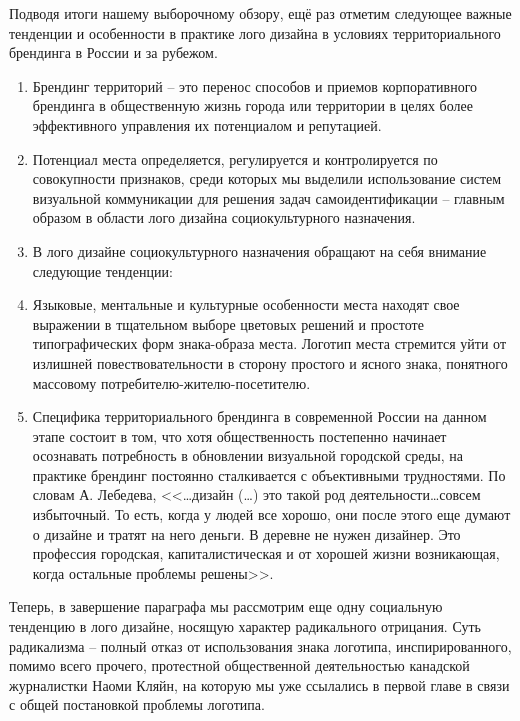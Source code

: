 Подводя итоги нашему выборочному обзору, ещё раз отметим следующее важные тенденции и особенности в
практике лого дизайна в условиях территориального брендинга в России и за рубежом.
\begin{enumerate}
\item Брендинг территорий -- это перенос способов и приемов корпоративного брендинга в общественную
  жизнь города или территории  в целях более эффективного управления их потенциалом и репутацией.
\item Потенциал места определяется, регулируется и контролируется по совокупности признаков, среди
  которых мы выделили использование систем визуальной коммуникации для решения задач
  самоидентификации -- главным образом в области лого дизайна социокультурного назначения.
\item В лого дизайне социокультурного назначения обращают на себя внимание следующие тенденции:
\item Языковые, ментальные и культурные особенности места находят свое выражении в тщательном выборе
  цветовых решений и простоте типографических форм знака-образа места. Логотип места стремится уйти
  от излишней повествовательности в сторону простого и ясного знака, понятного массовому
  потребителю-жителю-посетителю.
\item Специфика территориального брендинга в современной России на данном этапе состоит в том, что
  хотя общественность постепенно начинает осознавать потребность в обновлении визуальной городской
  среды, на практике брендинг постоянно сталкивается с объективными трудностями. По словам
  А. Лебедева, <<\ldots дизайн (\ldots) это такой род деятельности\ldots совсем избыточный. То есть,
  когда у людей все хорошо, они после этого еще думают о дизайне и тратят на него деньги. В деревне
  не нужен дизайнер. Это профессия городская, капиталистическая и от хорошей жизни возникающая,
  когда остальные проблемы решены>>. \autocite{link:plushev}
\end{enumerate}

Теперь, в завершение параграфа мы рассмотрим еще одну социальную тенденцию в лого дизайне, носящую
характер радикального отрицания. Суть радикализма – полный отказ от использования знака логотипа,
инспирированного, помимо всего прочего, протестной общественной деятельностью канадской журналистки
Наоми Кляйн, на которую мы уже ссылались в первой главе в связи с общей постановкой проблемы
логотипа.

